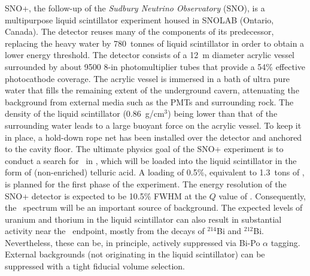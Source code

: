 SNO+, the follow-up of the \emph{Sudbury Neutrino Observatory} (SNO), is a multipurpose liquid scintillator experiment housed in SNOLAB (Ontario, Canada). The detector reuses many of the components of its predecessor, replacing the heavy water by 780~tonnes of liquid scintillator in order to obtain a lower energy threshold. The detector consists of a 12~m diameter acrylic vessel surrounded by about 9500 8-in photomultiplier tubes that provide a 54\% effective photocathode coverage. The acrylic vessel is immersed in a bath of ultra pure water that fills the remaining extent of the underground cavern, attenuating the background from external media such as the PMTs and surrounding rock. The density of the liquid scintillator (0.86~g/cm$^{3}$) being lower than that of the surrounding water leads to a large buoyant force on the acrylic vessel. To keep it in place, a hold-down rope net has been installed over the detector and anchored to the cavity floor. The ultimate physics goal of the SNO+ experiment is to conduct a search for \bbonu\ in , which will be loaded into the liquid scintillator in the form of (non-enriched) telluric acid. A loading of 0.5\%, equivalent to 1.3~tons of , is planned for the first phase of the experiment. The energy resolution of the SNO+ detector is expected to be 10.5\% FWHM at the $Q$ value of . Consequently, the \bbtnu\ spectrum will be an important source of background. The expected levels of uranium and thorium in the liquid scintillator can also result in substantial activity near the \bbonu\ endpoint, mostly from the decays of $^{214}$Bi and $^{212}$Bi. Nevertheless, these can be, in principle, actively suppressed via Bi-Po $\alpha$ tagging. External backgrounds (not originating in the liquid scintillator) can be suppressed with a tight fiducial volume selection.
